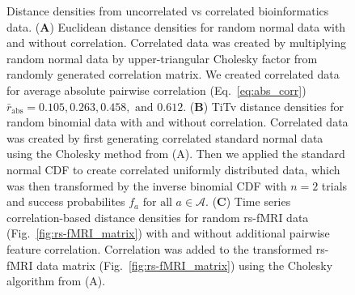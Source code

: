 \documentclass[aoas]{imsart}
\begin{document}

\begin{figure}[H]
	\centering
	\caption{Distance densities from uncorrelated vs correlated bioinformatics data. (\textbf{A}) Euclidean distance densities for random normal data with and without correlation. Correlated data was created by multiplying random normal data by upper-triangular Cholesky factor from randomly generated correlation matrix. We created correlated data for average absolute pairwise correlation (Eq.~\ref{eq:abs_corr}) $\bar{r}_\text{abs} = 0.105, 0.263, 0.458, \text{ and } 0.612$. (\textbf{B}) TiTv distance densities for random binomial data with and without correlation. Correlated data was created by first generating correlated standard normal data using the Cholesky method from (A). Then we applied the standard normal CDF to create correlated uniformly distributed data, which was then transformed by the inverse binomial CDF with $n=2$ trials and success probabilites $f_a \text{ for all } a \in \mathcal{A}$. (\textbf{C}) Time series correlation-based distance densities for random rs-fMRI data (Fig.~\ref{fig:rs-fMRI_matrix}) with and without additional pairwise feature correlation. Correlation was added to the transformed rs-fMRI data matrix (Fig.~\ref{fig:rs-fMRI_matrix}) using the Cholesky algorithm from (A).}\label{fig:null_vs_correlated_ridge}
\end{figure}
\end{document}
